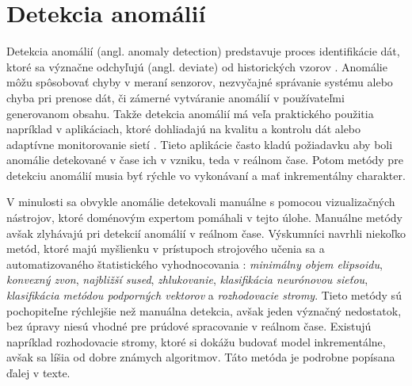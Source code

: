 \section{Detekcia anomálií}
Detekcia anomálií (angl. anomaly detection) predstavuje proces identifikácie dát, ktoré sa význačne odchyľujú (angl. deviate) od historických vzorov \citep{hodge2004survey}. Anomálie môžu spôsobovať chyby v meraní senzorov, nezvyčajné správanie systému alebo chyba pri prenose dát, či zámerné vytváranie anomálií v používateľmi generovanom obsahu. 
Takže detekcia anomálií má veľa praktického použitia napríklad v aplikáciach, ktoré dohliadajú na kvalitu a kontrolu dát \citep{hill2007real} alebo adaptívne monitorovanie sietí  \citep{hill2010anomaly}. Tieto aplikácie často kladú požiadavku aby boli anomálie detekované v čase ich v vzniku, teda v reálnom čase. Potom metódy pre detekciu anomálií musia byť rýchle vo vykonávaní a mať inkrementálny charakter.
\par
V minulosti sa obvykle anomálie detekovali manuálne s pomocou vizualizačných nástrojov, ktoré doménovým expertom pomáhali v tejto úlohe. Manuálne metódy avšak zlyhávajú pri detekcií anomálií v reálnom čase. Výskumníci navrhli niekoľko metód, ktoré majú myšlienku v prístupoch strojového učenia sa a automatizovaného štatistického vyhodnocovania \citep{hill2010anomaly}: \textit{minimálny objem elipsoidu}, \textit{konvexný zvon}, \textit{najbližší sused}, \textit{zhlukovanie}, \textit{klasifikácia neurónovou sieťou}, \textit{klasifikácia metódou podporných vektorov} a \textit{rozhodovacie stromy}. Tieto metódy sú pochopiteľne rýchlejšie než manuálna detekcia, avšak jeden význačný nedostatok, bez úpravy niesú vhodné pre prúdové spracovanie v reálnom čase. Existujú napríklad rozhodovacie stromy, ktoré si dokážu budovať model inkrementálne, avšak sa líšia od dobre známych algoritmov. Táto metóda je podrobne popísana ďalej v texte.

